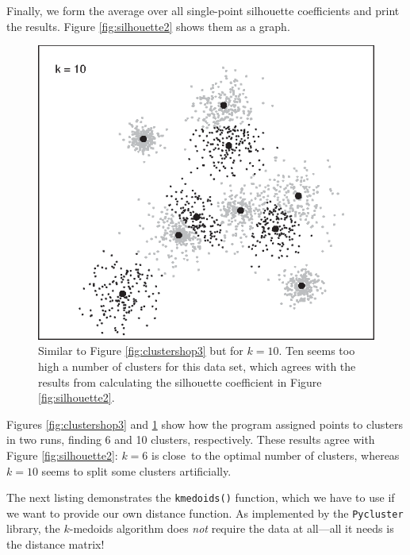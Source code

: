Finally, we form the average over all single-point silhouette
coefficients and print the results. Figure \ref{fig:silhouette2} shows
them as a graph.

\begin{figure}
  \centerline{\includegraphics{img/clustershop4}}
  \caption{Similar to Figure \ref{fig:clustershop3} but for $k=10$.
    Ten seems too high a number of clusters for this data set, which
    agrees with the results from calculating the silhouette
    coefficient in Figure \ref{fig:silhouette2}.}
  \label{fig:clustershop4}
\end{figure}

Figures \ref{fig:clustershop3} and \ref{fig:clustershop4} show how the
program assigned points to clusters in two runs, finding 6 and 10
clusters, respectively.\vadjust{\pagebreak}  These results agree with Figure
\ref{fig:silhouette2}: $k=6$ is close~to the optimal number of
clusters, whereas $k=10$ seems to split some clusters artificially.

The next listing demonstrates the \texttt{kmedoids()} function, which
we have to use if we want to provide our own distance function.  As
implemented by the \texttt{Pycluster} library, the $k$-medoids
algorithm does \emph{not} require the data at all---all it needs is
the distance matrix!

